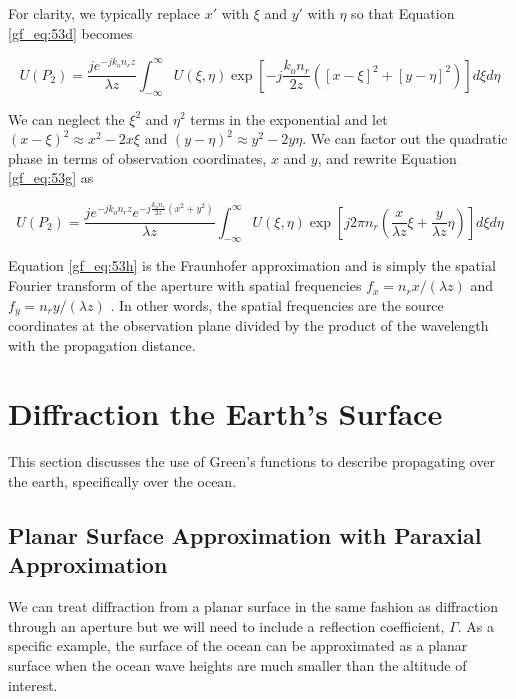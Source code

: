 For clarity, we typically replace $x'$ with $\xi$ and $y'$ with $\eta$ so that Equation \ref{gf_eq:53d} becomes

\begin{equation}
U(P_2) =\frac{je^{-jk_on_rz}}{\lambda z}\int_{-\infty}^{\infty} U(\xi,\eta)\exp\left[-j \frac{k_on_r}{2z}\left([x-\xi]^2 + [y-\eta]^2 \right) \right]d\xi d\eta
\label{gf_eq:53g}
\end{equation}
\renewcommand{\baselinestretch}{2} \small\normalsize

We can neglect the $\xi^2$ and $\eta^2$ terms in the exponential and let $(x-\xi)^2 \approx x^2-2x\xi$ and $(y-\eta)^2\approx y^2-2y\eta$. We can factor out the quadratic phase in terms of observation coordinates, $x$ and $y$, and rewrite Equation \ref{gf_eq:53g} as

\begin{equation}
\boxed{U(P_2) =\frac{je^{-jk_on_rz}e^{-j\frac{k_on_r}{2z}(x^2+y^2)}}{\lambda z}\int_{-\infty}^{\infty} U(\xi,\eta)\exp\left[j2\pi n_r\left(\frac{x}{\lambda z}\xi + \frac{y}{\lambda z}\eta \right) \right]d\xi d\eta}
\label{gf_eq:53h}
\end{equation}
\renewcommand{\baselinestretch}{2} \small\normalsize

Equation \ref{gf_eq:53h} is the Fraunhofer approximation and is simply the spatial Fourier transform of the aperture with spatial frequencies $f_x = n_rx/(\lambda z)$ and $f_y = n_ry/(\lambda z)$ \cite{goodman_fourier} \cite{gaskill_fourier}. In other words, the spatial frequencies are the source coordinates at the observation plane divided by the product of the wavelength with the propagation distance.

\section {Diffraction the Earth's Surface}
This section discusses the use of Green's functions to describe propagating over the earth, specifically over the ocean.

\subsection{Planar Surface Approximation with Paraxial Approximation}
We can treat diffraction from a planar surface in the same fashion as diffraction through an aperture but we will need to include a reflection coefficient, $\Gamma$. As a specific example, the surface of the ocean can be approximated as a planar surface when the ocean wave heights are much smaller than the altitude of interest.

